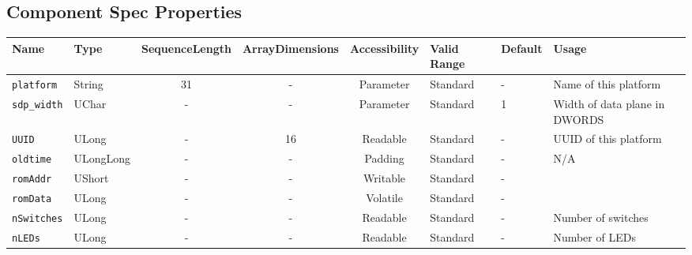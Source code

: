 \documentclass{article}
\begin{document}
\begin{landscape}
	\section*{Component Spec Properties}
	\begin{scriptsize}
		\begin{tabular}{|p{3cm}|p{1.5cm}|c|c|c|p{1.5cm}|p{1cm}|p{6cm}|}
			\hline
			\rowcolor{blue}
			Name               & Type   & SequenceLength & ArrayDimensions & Accessibility      & Valid Range & Default & Usage                                                                         \\
			\hline
			\verb+platform+    & String & 31             & -               & Parameter & Standard & - & Name of this platform                                                     \\
			\hline
			\verb+sdp_width+   & UChar  & -              & -               & Parameter & Standard & 1 & Width of data plane in DWORDS                                             \\
			\hline
			\verb+UUID+        & ULong  & -              & 16              & Readable           & Standard    & -       & UUID of this platform                                                         \\
			\hline
			\verb+oldtime+     & ULongLong & -           & -               & Padding            & Standard    & -       & N/A                                                                           \\
			\hline
			\verb+romAddr+     & UShort & -              & -               & Writable           & Standard    & -       &                                                                               \\
			\hline
			\verb+romData+     & ULong  & -              & -               & Volatile           & Standard    & -       &                                                                               \\
			\hline
			\verb+nSwitches+   & ULong  & -              & -               & Readable           & Standard    & -       & Number of switches                                                            \\
			\hline
			\verb+nLEDs+       & ULong  & -              & -               & Readable           & Standard    & -       & Number of LEDs                                                                \\
			\hline

\end{tabular}
\end{scriptsize}
\end{landscape}
\end{document}
